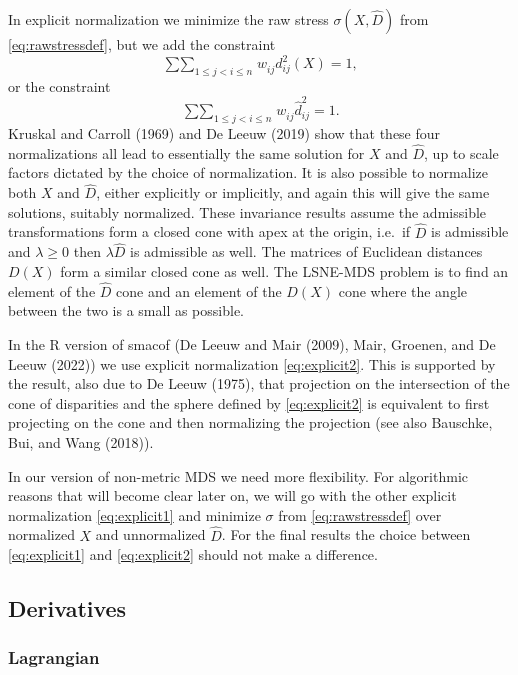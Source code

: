\documentclass[
  12pt,
]{article}
\newcommand{\jis}{\mathop{\sum\sum}_{1\leq j<i\leq n}}
\begin{document}
In explicit normalization we minimize the raw stress \(\sigma(X,\hat D)\)
from \eqref{eq:rawstressdef}, but we add the constraint
\begin{equation}
\jis w_{ij}^{\ }d_{ij}^2(X)=1,
\label{eq:explicit1}
\end{equation}
or the constraint
\begin{equation}
\jis w_{ij}^{\ }\hat d_{ij}^2=1.
\label{eq:explicit2}
\end{equation}
Kruskal and Carroll (1969) and De Leeuw (2019) show that these
four normalizations all lead to essentially the same solution for \(X\)
and \(\hat D\), up to scale factors dictated by the choice of
normalization. It is also possible to normalize both \(X\) and \(\hat D\),
either explicitly or implicitly, and again this will give the same
solutions, suitably normalized. These invariance results assume the
admissible transformations form a closed cone with apex at the origin,
i.e.~if \(\hat D\) is admissible and \(\lambda\geq 0\) then \(\lambda\hat D\)
is admissible as well. The matrices of Euclidean distances \(D(X)\) form a
similar closed cone as well. The LSNE-MDS problem is to find an element of the
\(\hat D\) cone and an element of the \(D(X)\) cone where the angle between
the two is a small as possible.

In the R version of smacof (De Leeuw and Mair (2009),
Mair, Groenen, and De Leeuw (2022)) we use explicit normalization
\eqref{eq:explicit2}. This is supported by the result, also due to
De Leeuw (1975), that projection on the intersection of the cone of
disparities and the sphere defined by \eqref{eq:explicit2} is equivalent
to first projecting on the cone and then normalizing the projection (see
also Bauschke, Bui, and Wang (2018)).

In our version of non-metric MDS we need more flexibility. For algorithmic
reasons that will become clear later on, we will go with the other explicit
normalization \eqref{eq:explicit1} and minimize \(\sigma\) from
\eqref{eq:rawstressdef} over normalized \(X\) and unnormalized \(\hat D\).
For the final results the choice between \eqref{eq:explicit1} and
\eqref{eq:explicit2} should not make a difference.

\subsection{Derivatives}\label{derivatives}

\subsubsection{Lagrangian}\label{lagrangian}
\end{document}
